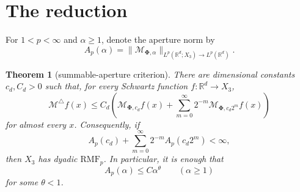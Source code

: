 \documentclass[11pt]{article}
\newtheorem{theorem}{Theorem}
\newcommand{\M}{\mathcal M}
\newcommand{\PhiClass}{\boldsymbol\Phi}
\begin{document}
\section{The reduction}

For $1<p<\infty$ and $\alpha\geq1$, denote the aperture norm by
\[
 A_p(\alpha)=
 \|\M_{\PhiClass,\alpha}\|_{L^p(\mathbb R^d;X_3)\to L^p(\mathbb R^d)}.
\]

\begin{theorem}[summable-aperture criterion]\label{thm:main}
There are dimensional constants $c_d,C_d>0$ such that, for every Schwartz
function $f:\mathbb R^d\to X_3$,
\begin{equation}\label{eq:pointwise}
 \M^\triangle f(x)
 \leq C_d\left(
 \M_{\PhiClass,c_d}f(x)
 +\sum_{m=0}^{\infty}2^{-m}
       \M_{\PhiClass,c_d2^m}f(x)\right)
\end{equation}
for almost every $x$.  Consequently, if
\begin{equation}\label{eq:summability}
 A_p(c_d)+\sum_{m=0}^{\infty}2^{-m}A_p(c_d2^m)<\infty,
\end{equation}
then $X_3$ has dyadic $\mathrm{RMF}_p$.  In particular, it is enough that
\[
 A_p(\alpha)\leq C\alpha^\theta\qquad(\alpha\geq1)
\]
for some $\theta<1$.
\end{theorem}
\end{document}
